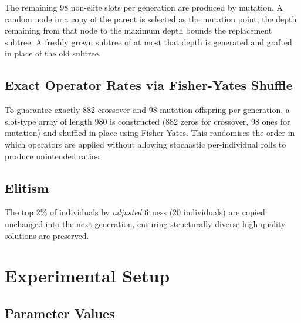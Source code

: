 \documentclass[12pt,a4paper]{article}
\begin{document}
The remaining 98 non-elite slots per generation are produced by mutation. A random
node in a copy of the parent is selected as the mutation point; the depth remaining
from that node to the maximum depth bounds the replacement subtree. A freshly grown
subtree of at most that depth is generated and grafted in place of the old subtree.

\subsection{Exact Operator Rates via Fisher-Yates Shuffle}

To guarantee exactly 882 crossover and 98 mutation offspring per generation, a
slot-type array of length 980 is constructed (882 zeros for crossover, 98 ones for
mutation) and shuffled in-place using Fisher-Yates. This randomises the order in
which operators are applied without allowing stochastic per-individual rolls to
produce unintended ratios.

\subsection{Elitism}

The top 2\% of individuals by \emph{adjusted} fitness (20 individuals) are copied
unchanged into the next generation, ensuring structurally diverse high-quality
solutions are preserved.

\section{Experimental Setup}

\subsection{Parameter Values}
\end{document}
